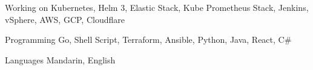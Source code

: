 

\begin{cvskills}

  \cvskill
    {Working on} %
    {Kubernetes, Helm 3, Elastic Stack, Kube Prometheus Stack, Jenkins, vSphere, AWS, GCP, Cloudflare} %

  \cvskill
    {Programming} %
    {Go, Shell Script, Terraform, Ansible, Python, Java, React, C\#} %

  \cvskill
    {Languages} %
    {Mandarin, English} %

\end{cvskills}
